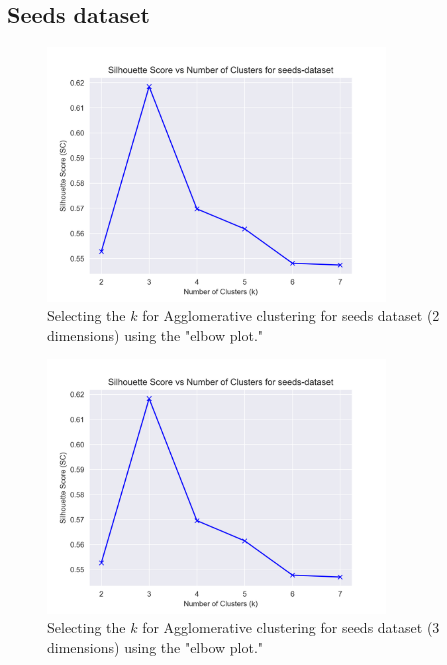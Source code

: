 \subsection{Seeds dataset}
\begin{figure}[H]
  \includegraphics[width=0.8\textwidth]{Appendix/parameter-selection/seeds-dataset_agglomerative_optimal_cluster_2.png}
  \caption{Selecting the $k$ for Agglomerative clustering for seeds dataset (2 dimensions) using the "elbow plot."}
  \label{hyperparameters:agglomerative-seeds-dataset-2d}
\end{figure}
\begin{figure}[H]
  \includegraphics[width=0.8\textwidth]{Appendix/parameter-selection/seeds-dataset_agglomerative_optimal_cluster_3.png}
  \caption{Selecting the $k$ for Agglomerative clustering for seeds dataset (3 dimensions) using the "elbow plot."}
  \label{hyperparameters:agglomerative-seeds-dataset-3d}
\end{figure}

